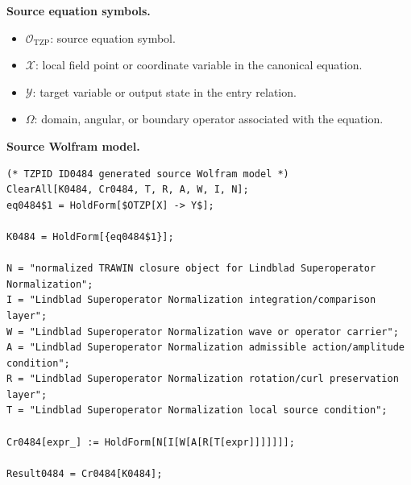 \begin{minipage}[t]{0.49\linewidth}
\begingroup
\small
\raggedright
\textbf{Source equation symbols.}\par
\begin{itemize}[leftmargin=1.35em,itemsep=1pt,topsep=1pt,parsep=0pt]
    \item $\mathcal{O}_{\mathrm{TZP}}$: source equation symbol.
    \item $\mathcal{X}$: local field point or coordinate variable in the canonical equation.
    \item $\mathcal{Y}$: target variable or output state in the entry relation.
    \item $\Omega$: domain, angular, or boundary operator associated with the equation.
\end{itemize}
\endgroup
\end{minipage}\hfill
\begin{minipage}[t]{0.47\linewidth}
\begingroup
\scriptsize
\raggedright
\textbf{Source Wolfram model.}\par
\begin{Verbatim}[fontsize=\tiny,breaklines=true,breakanywhere=true]
(* TZPID ID0484 generated source Wolfram model *)
ClearAll[K0484, Cr0484, T, R, A, W, I, N];
eq0484$1 = HoldForm[$OTZP[X] -> Y$];

K0484 = HoldForm[{eq0484$1}];

N = "normalized TRAWIN closure object for Lindblad Superoperator Normalization";
I = "Lindblad Superoperator Normalization integration/comparison layer";
W = "Lindblad Superoperator Normalization wave or operator carrier";
A = "Lindblad Superoperator Normalization admissible action/amplitude condition";
R = "Lindblad Superoperator Normalization rotation/curl preservation layer";
T = "Lindblad Superoperator Normalization local source condition";

Cr0484[expr_] := HoldForm[N[I[W[A[R[T[expr]]]]]]];

Result0484 = Cr0484[K0484];
\end{Verbatim}
\endgroup
\end{minipage}

